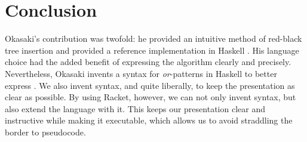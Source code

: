 \documentclass[preprint]{sigplanconf}
\begin{document}
\section{Conclusion}

Okasaki's contribution was twofold: he provided an intuitive method of red-black
tree insertion and provided a reference implementation in Haskell
\cite{hudak1992report}. His language choice had the added benefit of expressing
the algorithm clearly and precisely. Nevertheless, Okasaki invents a syntax for
\emph{or}-patterns in Haskell to better express . We also invent
syntax, and quite liberally, to keep the presentation as clear as possible. By
using Racket, however, we can not only invent syntax, but also extend the
language with it. This keeps our presentation clear and instructive while making
it executable, which allows us to avoid straddling the border to pseudocode.

%
%
% 



% 
%
%
%
\end{document}

